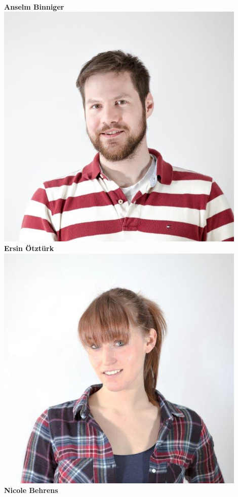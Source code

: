 \documentclass{beamer}
\begin{document}
\begin{frame}[t]
\begin{columns}[t]
    		\\
    		\textbf{Anselm Binniger}
    		\includegraphics[width=0.9\textwidth]{ersin.jpg}
    		\\
    		\textbf{Ersin Ötztürk}
    		\includegraphics[width=0.9\textwidth]{nicole.jpg}
    		\\
    		\textbf{Nicole Behrens}
    	\end{columns}
    \end{frame}
    
\end{document}
